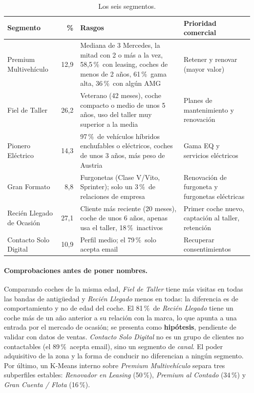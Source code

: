 \documentclass[11pt,a4paper]{article}
\newcommand{\pct}{\,\%}
\newcommand{\seg}[1]{\textit{#1}}
\begin{document}
\begin{table}[H]
  \centering
  \small
  \caption{Los seis segmentos.}
  \label{tab:segmentos}
  \begin{tabularx}{\textwidth}{>{\raggedright\arraybackslash}p{3.1cm}rLL}
    \toprule
    Segmento & \% & Rasgos & Prioridad comercial \\
    \midrule
    Premium Multivehículo & 12,9 & Mediana de 3 Mercedes, la mitad con 2 o más a la vez, 58,5\pct\ con leasing, coches
      de menos de 2 años, 61\pct\ gama alta, 36\pct\ con algún AMG & Retener y renovar (mayor valor) \\
    Fiel de Taller & 26,2 & Veterano (42 meses), coche compacto o medio de unos 5 años, uso del taller muy superior a
      la media & Planes de mantenimiento y renovación \\
    Pionero Eléctrico & 14,3 & 97\pct\ de vehículos híbridos enchufables o eléctricos, coches de unos 3 años, más peso
      de Austria & Gama EQ y servicios eléctricos \\
    Gran Formato & 8,8 & Furgonetas (Clase V/Vito, Sprinter); solo un 3\pct\ de relaciones de empresa & Renovación de
      furgoneta y furgonetas eléctricas \\
    Recién Llegado de Ocasión & 27,1 & Cliente más reciente (20 meses), coche de unos 6 años, apenas usa el taller,
      18\pct\ inactivos & Primer coche nuevo, captación al taller, retención \\
    Contacto Solo Digital & 10,9 & Perfil medio; el 79\pct\ solo acepta email & Recuperar consentimientos \\
    \bottomrule
  \end{tabularx}
\end{table}

\paragraph{Comprobaciones antes de poner nombres.} Comparando coches de la misma edad, \seg{Fiel de Taller} tiene más
visitas en todas las bandas de antigüedad y \seg{Recién Llegado} menos en todas: la diferencia es de comportamiento y no
de edad del coche. El 81\pct\ de \seg{Recién Llegado} tiene un coche más de un año anterior a su relación con la marca,
lo que apunta a una entrada por el mercado de ocasión; se presenta como \textbf{hipótesis}, pendiente de validar con datos
de ventas. \seg{Contacto Solo Digital} no es un grupo de clientes no contactables (el 89\pct\ acepta email), sino un
segmento de \emph{canal}. El poder adquisitivo de la zona y la forma de conducir no diferencian a ningún segmento. Por
último, un K-Means interno sobre \seg{Premium Multivehículo} separa tres subperfiles estables: \emph{Renovador en
Leasing} (50\pct), \emph{Premium al Contado} (34\pct) y \emph{Gran Cuenta / Flota} (16\pct).
\end{document}

